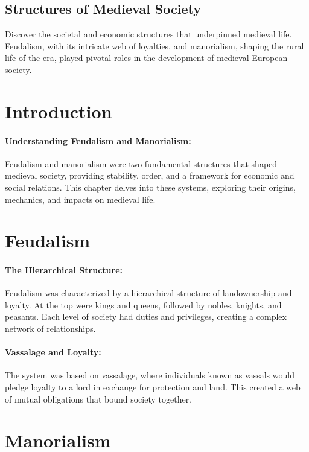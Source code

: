 \documentclass[a4paper,12pt]{book}
\begin{document}
\subsection*{Structures of Medieval Society}
Discover the societal and economic structures that underpinned medieval life. Feudalism, with its intricate web of loyalties, and manorialism, shaping the rural life of the era, played pivotal roles in the development of medieval European society.

\section*{Introduction}

\paragraph{Understanding Feudalism and Manorialism:}
Feudalism and manorialism were two fundamental structures that shaped medieval society, providing stability, order, and a framework for economic and social relations. This chapter delves into these systems, exploring their origins, mechanics, and impacts on medieval life.

\section*{Feudalism}

\paragraph{The Hierarchical Structure:}
Feudalism was characterized by a hierarchical structure of landownership and loyalty. At the top were kings and queens, followed by nobles, knights, and peasants. Each level of society had duties and privileges, creating a complex network of relationships.

\paragraph{Vassalage and Loyalty:}
The system was based on vassalage, where individuals known as vassals would pledge loyalty to a lord in exchange for protection and land. This created a web of mutual obligations that bound society together.

\section*{Manorialism}
\end{document}
